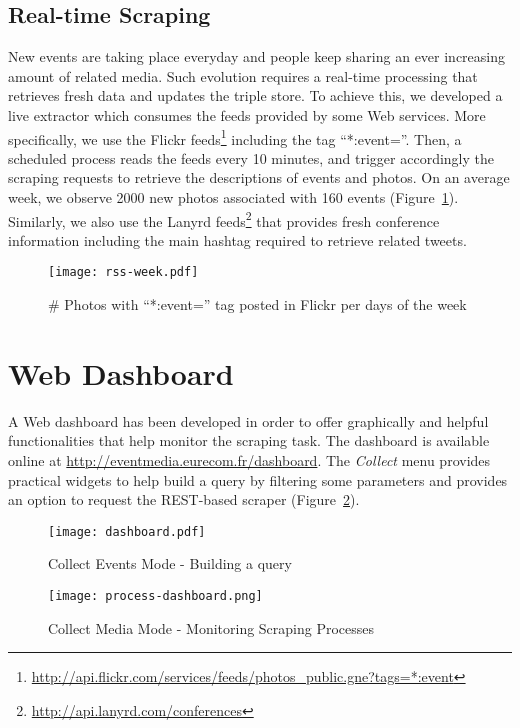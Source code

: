 \subsection{Real-time Scraping}
New events are taking place everyday and people keep sharing an ever increasing amount of related media. Such evolution requires a real-time processing that retrieves fresh data and updates the triple store. To achieve this, we developed a live extractor which consumes the feeds provided by some Web services. More specifically, we use the Flickr feeds\footnote{\url{http://api.flickr.com/services/feeds/photos_public.gne?tags=*:event}}  including the tag ``*:event=''. Then, a scheduled process reads the feeds every 10 minutes, and trigger accordingly the scraping requests to retrieve the descriptions of events and photos.  On an average week, we observe 2000 new photos associated with 160 events (Figure~\ref{fig:flickr-rss}). Similarly, we also use the Lanyrd feeds\footnote{\url{http://api.lanyrd.com/conferences}} that provides fresh conference information including the main hashtag required to retrieve related tweets. 

\begin{figure}[H]
  \centering
  \texttt{[image: rss-week.pdf]}
  \caption{\# Photos with ``*:event='' tag posted in Flickr per days of the week}
  \label{fig:flickr-rss} 
\end{figure}

\section{Web Dashboard}

A Web dashboard has been developed in order to offer graphically and helpful functionalities that help monitor the scraping task. The dashboard is available online at \url{http://eventmedia.eurecom.fr/dashboard}. The \textit{Collect} menu provides practical widgets to help build a query by filtering some parameters and provides an option to request the REST-based scraper (Figure~\ref{fig:dashboard}). 
\vspace*{2mm}
\begin{figure}[htbp]
  \centering
  \texttt{[image: dashboard.pdf]}
  \caption{Collect Events Mode - Building a query}
  \label{fig:dashboard}
\end{figure}

\begin{figure}[htbp]
  \centering
  \texttt{[image: process-dashboard.png]}
  \caption{Collect Media Mode - Monitoring Scraping Processes}
  \label{fig:process-dashboard}
\end{figure}

